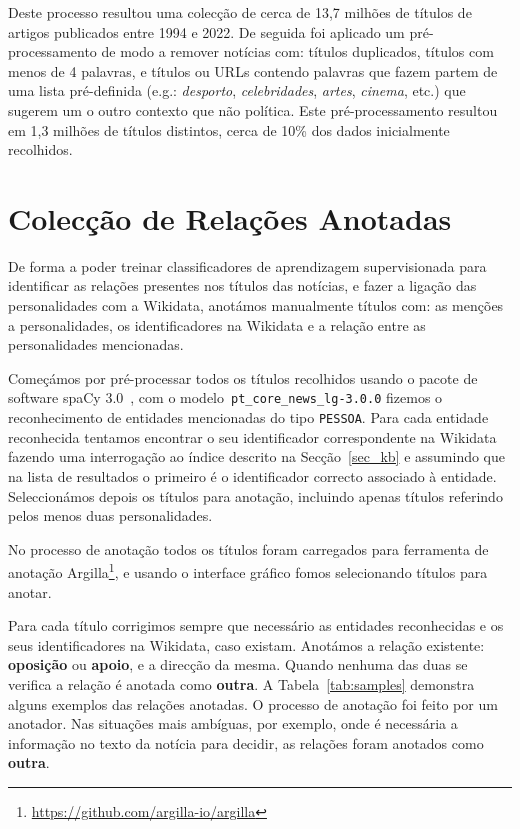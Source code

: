 \documentclass[a4paper, twocolumn, 11pt, twoside]{article}
\begin{document}
Deste processo resultou uma colecção de cerca de 13,7 milhões de títulos de artigos publicados entre 1994 e 2022. De seguida foi aplicado um pré-processamento de modo a remover notícias com: títulos duplicados, títulos com menos de 4 palavras, e títulos ou URLs contendo palavras que fazem partem de uma lista pré-definida (e.g.: \textit{desporto}, \textit{celebridades}, \textit{artes}, \textit{cinema}, etc.) que sugerem um o outro contexto que não política. Este pré-processamento resultou em 1,3 milhões de títulos distintos, cerca de 10\% dos dados inicialmente recolhidos.

\section{Colecção de Relações Anotadas}
\label{sec:rel_data_annot}

De forma a poder treinar classificadores de aprendizagem supervisionada para identificar as relações presentes nos títulos das notícias, e fazer a ligação das personalidades com a Wikidata, anotámos manualmente títulos com: as menções a personalidades, os identificadores na Wikidata e a relação entre as personalidades mencionadas.

Começámos por pré-processar todos os títulos recolhidos usando o pacote de software spaCy 3.0~\citep{spacy}, com o modelo~\texttt{pt\_core\_news\_lg-3.0.0} fizemos o reconhecimento de entidades mencionadas do tipo \texttt{PESSOA}. Para cada entidade reconhecida tentamos encontrar o seu identificador correspondente na Wikidata fazendo uma interrogação ao índice descrito na Secção~\ref{sec_kb} e assumindo que na lista de resultados o primeiro é o identificador correcto associado à entidade. Seleccionámos depois os títulos para anotação, incluindo apenas títulos referindo pelos menos duas personalidades.

No processo de anotação todos os títulos foram carregados para ferramenta de anotação Argilla\footnote{\url{https://github.com/argilla-io/argilla}}, e usando o interface gráfico fomos selecionando títulos para anotar. 

Para cada título corrigimos sempre que necessário as entidades reconhecidas e os seus identificadores na Wikidata, caso existam. Anotámos a relação existente: \textbf{oposição} ou \textbf{apoio}, e a direcção da mesma. Quando nenhuma das duas se verifica a relação é anotada como \textbf{outra}. A Tabela~\ref{tab:samples} demonstra alguns exemplos das relações anotadas. O processo de anotação foi feito por um anotador. Nas situações mais ambíguas, por exemplo, onde é necessária a informação no texto da notícia para decidir, as relações foram anotados como \textbf{outra}.
\end{document}
